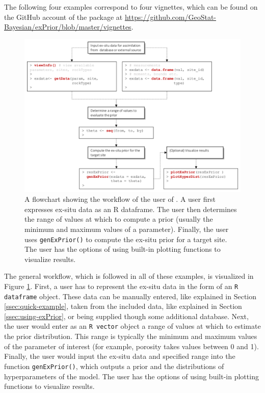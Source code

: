 The following four examples correspond to four vignettes, which can be found on the GitHub account of the  package at \url{https://github.com/GeoStat-Bayesian/exPrior/blob/master/vignettes}.

\begin{figure}[ht]
    \centering
    \includegraphics[width=1.0\textwidth]{img/package_workflow.pdf}
    \caption{A flowchart showing the workflow of the user of . A user first expresses ex-situ data as an R dataframe. The user then determines the range of values at which to compute a prior (usually the minimum and maximum values of a parameter). Finally, the user uses \texttt{genExPrior()} to compute the ex-situ prior for a target site. The user has the options of using built-in plotting functions to visualize results.}
    \label{fig:package_workflow}
\end{figure}

The general workflow, which is followed in all of these examples, is visualized in Figure \ref{fig:package_workflow}. 
First, a user has to represent the ex-situ data in the form of an \texttt{R dataframe} object.
These data can be manually entered, like explained in Section \ref{ssec:quick-example}, taken from the included data, like explained in Section \ref{ssec:using-exPrior}, or being supplied though some additional database. 
Next, the user would enter as an \texttt{R vector} object a range of values at which to estimate the prior distribution. 
This range is typically the minimum and maximum values of the parameter of interest (for example, porosity takes values between 0 and 1). 
Finally, the user would input the ex-situ data and specified range into the function \texttt{genExPrior()}, which outputs a prior and the distributions of hyperparameters of the model.
The user has the options of using built-in plotting functions to visualize results.


